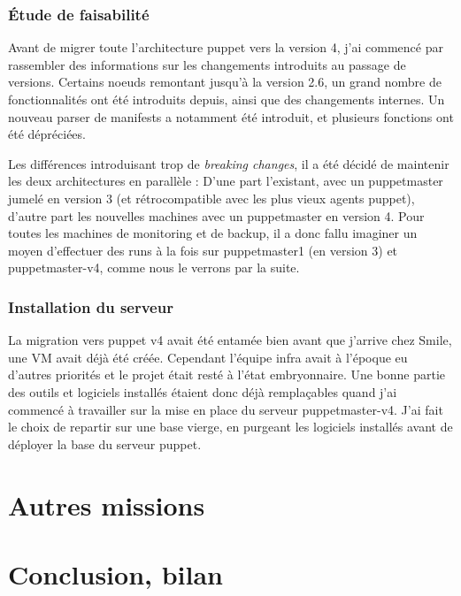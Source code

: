 \documentclass[14 pt]{extreport}
\begin{document}
\subsection{Étude de faisabilité}

Avant de migrer toute l'architecture puppet vers la version 4, j'ai commencé par rassembler des informations sur les changements introduits au passage de versions. Certains noeuds remontant jusqu'à la version 2.6, un grand nombre de fonctionnalités ont été introduits depuis, ainsi que des changements internes. Un nouveau parser de manifests a notamment été introduit, et plusieurs fonctions ont été dépréciées.

Les différences introduisant trop de \emph{breaking changes}, il a été décidé de maintenir les deux architectures en parallèle : D'une part l'existant, avec un puppetmaster jumelé en version 3 (et rétrocompatible avec les plus vieux agents puppet), d'autre part les nouvelles machines avec un puppetmaster en version 4. Pour toutes les machines de monitoring et de backup, il a donc fallu imaginer un moyen d'effectuer des runs à la fois sur puppetmaster1 (en version 3) et puppetmaster-v4, comme nous le verrons par la suite.

\subsection{Installation du serveur}

La migration vers puppet v4 avait été entamée bien avant que j'arrive chez Smile, une VM avait déjà été créée. Cependant l'équipe infra avait à l'époque eu d'autres priorités et le projet était resté à l'état embryonnaire. Une bonne partie des outils et logiciels installés étaient donc déjà remplaçables quand j'ai commencé à travailler sur la mise en place du serveur puppetmaster-v4. J'ai fait le choix de repartir sur une base vierge, en purgeant les logiciels installés avant de déployer la base du serveur puppet.  



\lipsum[1]
\lipsum[1]
\lipsum[1]
\lipsum[1]


\chapter{Autres missions}
\lipsum

\chapter{Conclusion, bilan}
\lipsum
\end{document}
